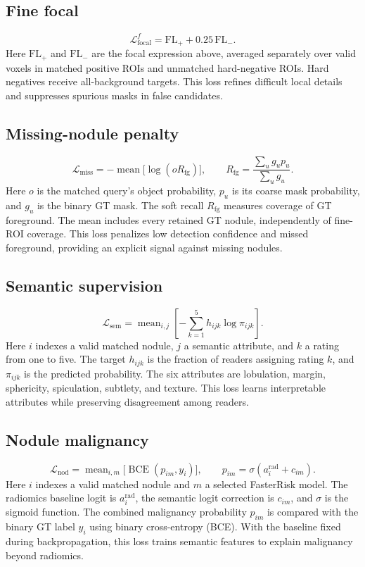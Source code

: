\documentclass[11pt,a4paper]{article}
\newcommand{\loss}[1]{\mathcal L_{\mathrm{#1}}}
\newcommand{\mean}{\operatorname{mean}}
\newcommand{\BCE}{\operatorname{BCE}}
\newcommand{\lossheading}[1]{\subsection{#1}}
\newenvironment{lossblock}[1]{%
  \par\addvspace{3pt}\noindent\begin{minipage}{\textwidth}%
  \lossheading{#1}%
}{\end{minipage}\par}
\begin{document}
\begin{lossblock}{Fine focal}
\[
  \loss{focal}^{f}=\mathrm{FL}_{+}+0.25\,\mathrm{FL}_{-}.
\]
Here $\mathrm{FL}_{+}$ and $\mathrm{FL}_{-}$ are the focal expression above,
averaged separately over valid voxels in matched positive ROIs and
unmatched hard-negative ROIs. Hard negatives receive all-background
targets. This loss refines difficult local details and suppresses spurious
masks in false candidates.
\end{lossblock}

\begin{lossblock}{Missing-nodule penalty}
\[
  \loss{miss}=-\mean\bigl[\log(oR_{\mathrm{fg}})\bigr],
  \qquad R_{\mathrm{fg}}=\frac{\sum_u g_u p_u}{\sum_u g_u}.
\]
Here $o$ is the matched query's object probability, $p_u$ is its coarse
mask probability, and $g_u$ is the binary GT mask.
The soft recall $R_{\mathrm{fg}}$ measures coverage of GT foreground.
The mean includes every retained GT nodule, independently of fine-ROI
coverage. This loss penalizes low detection confidence and missed
foreground, providing an explicit signal against missing nodules.
\end{lossblock}

\begin{lossblock}{Semantic supervision}
\[
  \loss{sem}
  =\mean_{i,j}\left[-\sum_{k=1}^{5}h_{ijk}\log\pi_{ijk}\right].
\]
Here $i$ indexes a valid matched nodule, $j$ a semantic attribute, and $k$
a rating from one to five. The target $h_{ijk}$ is the fraction of readers
assigning rating $k$, and $\pi_{ijk}$ is the predicted probability.
The six attributes are lobulation, margin, sphericity, spiculation,
subtlety, and texture. This loss learns interpretable attributes while
preserving disagreement among readers.
\end{lossblock}

\begin{lossblock}{Nodule malignancy}
\[
  \loss{nod}=\mean_{i,m}\bigl[\BCE(p_{im},y_i)\bigr],
  \qquad p_{im}=\sigma(a_i^{\mathrm{rad}}+c_{im}).
\]
Here $i$ indexes a valid matched nodule and $m$ a selected FasterRisk model.
The radiomics baseline logit is $a_i^{\mathrm{rad}}$, the semantic logit
correction is $c_{im}$, and $\sigma$ is the sigmoid function.
The combined malignancy probability $p_{im}$ is compared with the binary
GT label $y_i$ using binary cross-entropy (BCE).
With the baseline fixed during backpropagation, this loss trains semantic
features to explain malignancy beyond radiomics.
\end{lossblock}
\end{document}

